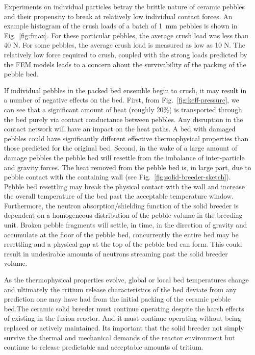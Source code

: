 Experiments on individual particles betray the brittle nature of ceramic pebbles and their propensity to break at relatively low individual contact forces. An example histogram of the crush loads of a batch of 1~mm \lit pebbles is shown in Fig.~\ref{fig:fmax}. For these particular pebbles, the average crush load was less than 40 N. For some \lis pebbles, the average crush load is measured as low as 10 N. The relatively low force required to crush, coupled with the strong loads predicted by the FEM models leads to a concern about the survivability of the packing of the pebble bed.

If individual pebbles in the packed bed ensemble begin to crush, it may result in a number of negative effects on the bed. First, from Fig.~\ref{fig:keff-pressure}, we can see that a significant amount of heat (roughly 20\%) is transported through the bed purely via contact conductance between pebbles. Any disruption in the contact network will have an impact on the heat paths. A bed with damaged pebbles could have significantly different effective thermophysical properties than those predicted for the original bed. Second, in the wake of a large amount of damage pebbles the pebble bed will resettle from the imbalance of inter-particle and gravity forces. The heat removed from the pebble bed is, in large part, due to pebble contact with the containing wall (see Fig.~\ref{fig:solid-breeder-sketch}). Pebble bed resettling may break the physical contact with the wall and increase the overall temperature of the bed past the acceptable temperature window. Furthermore, the neutron absorption/shielding function of the solid breeder is dependent on a homogeneous distribution of the pebble volume in the breeding unit. Broken pebble fragments will settle, in time, in the direction of gravity and accumulate at the floor of the pebble bed, concurrently the entire bed may be resettling and a physical gap at the top of the pebble bed can form. This could result in undesirable amounts of neutrons streaming past the solid breeder volume. 

As the thermophysical properties evolve, global or local bed temperatures change and ultimately the tritium release characteristics of the bed deviate from any prediction one may have had from the initial packing of the ceramic pebble bed.The ceramic solid breeder must continue operating despite the harsh effects of existing in the fusion reactor. And it must continue operating without being replaced or actively maintained. Its important that the solid breeder not simply survive the thermal and mechanical demands of the reactor environment but continue to release predictable and acceptable amounts of tritium. 


